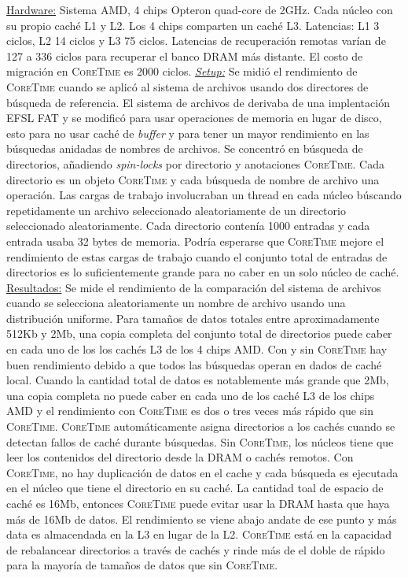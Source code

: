\underline{Hardware:} Sistema AMD, 4 chips Opteron quad-core de 2GHz. Cada núcleo con su propio caché L1 y L2. Los 4 chips comparten un caché L3. Latencias: L1 3 ciclos, L2 14 ciclos y L3 75 ciclos. Latencias de recuperación remotas varían de 127 a 336 ciclos para recuperar el banco DRAM más distante. El costo de migración en \textsc{CoreTime} es 2000 ciclos. \underline{\emph{Setup:}} Se midió el rendimiento de \textsc{CoreTime} cuando se aplicó al sistema de archivos usando dos directores de búsqueda de referencia. El sistema de archivos de derivaba de una implentación EFSL FAT y se modificó para usar operaciones de memoria en lugar de disco, esto para no usar caché de \emph{buffer} y para tener un mayor rendimiento en las búsquedas anidadas de nombres de archivos. Se concentró en búsqueda de directorios, añadiendo \emph{spin-locks} por directorio y anotaciones \textsc{CoreTime}. Cada directorio es un objeto \textsc{CoreTime} y cada búsqueda de nombre de archivo una operación. Las cargas de trabajo involucraban un thread en cada núcleo búscando repetidamente un archivo seleccionado aleatoriamente de un directorio seleccionado aleatoriamente. Cada directorio contenía 1000 entradas y cada entrada usaba 32 bytes de memoria. Podría esperarse que \textsc{CoreTime} mejore el rendimiento de estas cargas de trabajo cuando el conjunto total de entradas de directorios es lo suficientemente grande para no caber en un solo núcleo de caché. \underline{Resultados:} Se mide el rendimiento de la comparación del sistema de archivos cuando se selecciona aleatoriamente un nombre de archivo usando una distribución uniforme. Para tamaños de datos totales entre aproximadamente 512Kb  y 2Mb, una copia completa del conjunto total de directorios puede caber en cada uno de los los cachés L3 de los 4 chips AMD. Con y sin \textsc{CoreTime} hay buen rendimiento debido a que todos las búsquedas operan en dados de caché local. Cuando la cantidad total de datos es notablemente más grande que 2Mb, una copia completa no puede caber en cada uno de los caché L3 de los chips AMD y el rendimiento con \textsc{CoreTime} es dos o tres veces más rápido que sin \textsc{CoreTime}. \textsc{CoreTime} automáticamente asigna directorios a los cachés cuando se detectan fallos de caché durante búsquedas. Sin \textsc{CoreTime}, los núcleos tiene que leer los contenidos del directorio desde la DRAM o cachés remotos. Con \textsc{CoreTime}, no hay duplicación de datos en el cache y cada búsqueda es ejecutada en el núcleo que tiene el directorio en su caché. La cantidad toal de espacio de caché es 16Mb, entonces \textsc{CoreTime} puede evitar usar la DRAM hasta que haya más de 16Mb de datos. El rendimiento se viene abajo andate de ese punto y más data es almacendada en la L3 en lugar de la L2. \textsc{CoreTime} está en la capacidad de rebalancear directorios a través de cachés y rinde más de el doble de rápido para la mayoría de tamaños de datos que sin \textsc{CoreTime}. 

